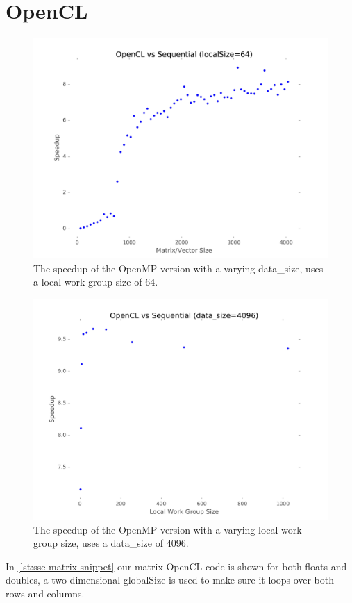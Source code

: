 \documentclass[final]{report}
\begin{document}
\chapter{OpenCL}

\begin{figure}[H]
\centering    
    \includegraphics[width=\linewidth]{resources/opencl-data-size-sweep.pdf}
    \caption{The speedup of the OpenMP version with a varying data\_size, uses a local work group size of 64.}
    \label{fig:opencl-data-size-sweep}
\end{figure}

\begin{figure}[H]
\centering
    \includegraphics[width=\linewidth]{resources/opencl-localsize-sweep.pdf}
    \caption{The speedup of the OpenMP version with a varying local work group size, uses a data\_size of 4096.}
    \label{fig:opencl-localsize-sweep}
\end{figure}

In \cref{lst:sse-matrix-snippet} our matrix OpenCL code is shown for both floats and doubles, a two dimensional globalSize is used to make sure it loops over both rows and columns.

\end{document}
